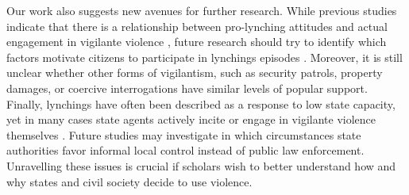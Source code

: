 \documentclass[12pt,a4paper]{article}
\begin{document}
Our work also suggests new avenues for further research. While previous studies
indicate that there is a relationship between pro-lynching attitudes and actual
engagement in vigilante violence \citep{weisburd1988vigilantism}, future
research should try to identify which factors motivate citizens to participate
in lynchings episodes \citep{nivette2016institutional}. Moreover, it is still
unclear whether other forms of vigilantism, such as security patrols, property
damages, or coercive interrogations \citep{bateson2020politics} have similar
levels of popular support. Finally, lynchings have often been described as a
response to low state capacity, yet in many cases state agents actively incite
or engage in vigilante violence themselves \citep{arias2010violent}. Future
studies may investigate in which circumstances state authorities favor informal
local control instead of public law enforcement. Unravelling these issues is
crucial if scholars wish to better understand how and why states and civil
society decide to use violence.

\renewcommand {\footnotesize} {\normalsize}
\theendnotes

\setlength{\parindent}{0cm}
\setlength{\parskip}{5pt}

\end{document}
